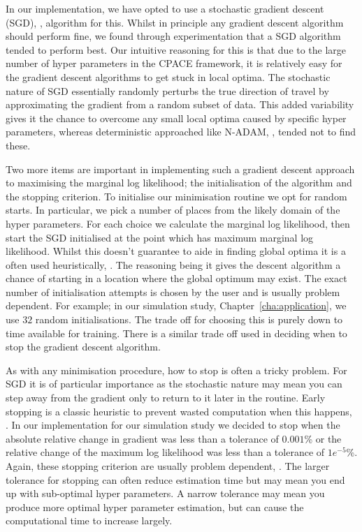 In our implementation, we have opted to use a stochastic gradient descent (SGD), \citep{sra_optimization_2012}, algorithm for this.
Whilst in principle any gradient descent algorithm should perform fine, we found through experimentation that a SGD algorithm tended to perform best.
Our intuitive reasoning for this is that due to the large number of hyper parameters in the CPACE framework, it is relatively easy for the gradient descent algorithms to get stuck in local optima.
The stochastic nature of SGD essentially randomly perturbs the true direction of travel by approximating the gradient from a random subset of data. 
This added variability gives it the chance to overcome any small local optima caused by specific hyper parameters, whereas deterministic approached like N-ADAM, \citep{dozat_incorporating_2016}, tended not to find these.

Two more items are important in implementing such a gradient descent approach to maximising the marginal log likelihood; the initialisation of the algorithm and the stopping criterion.
To initialise our minimisation routine we opt for random starts.
In particular, we pick a number of places from the likely domain of the hyper parameters.
For each choice we calculate the marginal log likelihood, then start the SGD initialised at the point which has maximum marginal log likelihood.
Whilst this doesn't guarantee to aide in finding global optima it is a often used heuristically, \citep{sra_optimization_2012}.
The reasoning being it gives the descent algorithm a chance of starting in a location where the global optimum may exist.
The exact number of initialisation attempts is chosen by the user and is usually problem dependent. 
For example; in our simulation study, Chapter~\ref{cha:application},  we use $32$ random initialisations.
The trade off for choosing this is purely down to time available for training.
There is a similar trade off used in deciding when to stop the gradient descent algorithm.

As with any minimisation procedure, how to stop is often a tricky problem.
For SGD it is of particular importance as the stochastic nature may mean you can step away from the gradient only to return to it later in the routine.
Early stopping is a classic heuristic to prevent wasted computation when this happens, \citep{sra_optimization_2012}.
In our implementation for our simulation study we decided to stop when the absolute relative change in gradient was less than a tolerance of $0.001$\% or the relative change of the maximum log likelihood was less than a tolerance of $1e^{-5}$\%. 
Again, these stopping criterion are usually problem dependent, \citep{sra_optimization_2012}.
The larger tolerance for stopping can often reduce estimation time but may mean you end up with sub-optimal hyper parameters.
A narrow tolerance may mean you produce more optimal hyper parameter estimation, but can cause the computational time to increase largely.


